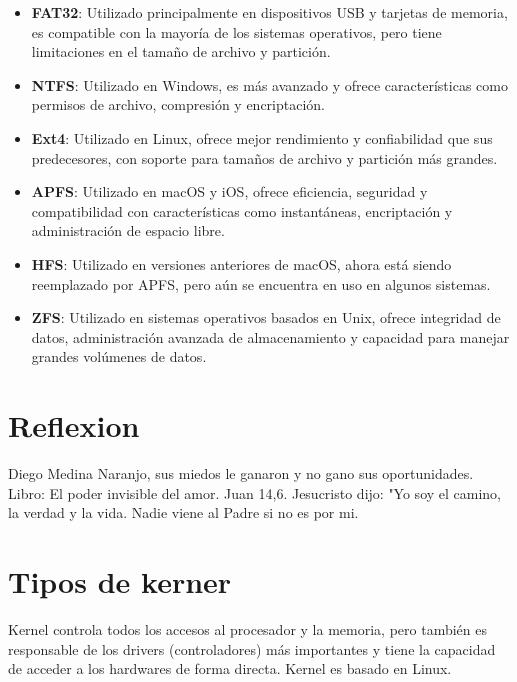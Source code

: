 \documentclass[11pt,twoside]{book}
\begin{document}
\begin{itemize}

\item \textbf{FAT32}: Utilizado principalmente en dispositivos USB y tarjetas de memoria, es compatible con la mayoría de los sistemas operativos, pero tiene limitaciones en el tamaño de archivo y partición.

\item \textbf{NTFS}: Utilizado en Windows, es más avanzado y ofrece características como permisos de archivo, compresión y encriptación.

\item \textbf{Ext4}: Utilizado en Linux, ofrece mejor rendimiento y confiabilidad que sus predecesores, con soporte para tamaños de archivo y partición más grandes.

\item \textbf{APFS}: Utilizado en macOS y iOS, ofrece eficiencia, seguridad y compatibilidad con características como instantáneas, encriptación y administración de espacio libre.

\item \textbf{HFS}: Utilizado en versiones anteriores de macOS, ahora está siendo reemplazado por APFS, pero aún se encuentra en uso en algunos sistemas.

\item\textbf{ZFS}: Utilizado en sistemas operativos basados en Unix, ofrece integridad de datos, administración avanzada de almacenamiento y capacidad para manejar grandes volúmenes de datos.
    
\end{itemize}

\section{Reflexion}
Diego Medina Naranjo, sus miedos le ganaron y no gano sus oportunidades.
Libro: El poder invisible del amor.
Juan 14,6. Jesucristo dijo: "Yo soy el camino, la verdad y la vida. Nadie viene al Padre si no es por mi.

\section{Tipos de kerner}
Kernel controla todos los accesos al procesador y la memoria, pero también es responsable de los drivers (controladores) más importantes y tiene la capacidad de acceder a los hardwares de forma directa. Kernel es basado en Linux.
\end{document}
